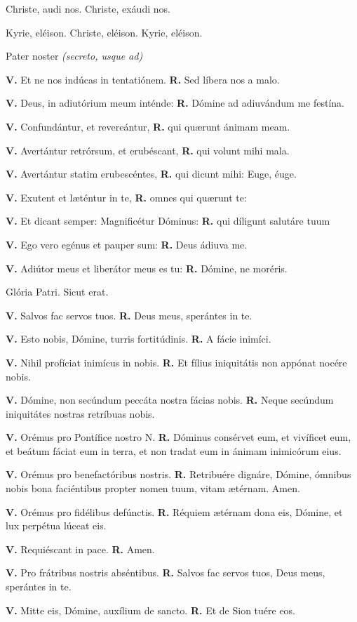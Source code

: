 \documentclass[12pt,a6paper]{book}
\newcommand{\V}{\textbf{V.} }
\newcommand{\R}{\textbf{R.} }
\begin{document}
\begin{sloppy}
\vspace{3mm}

Christe, audi nos. Christe, exáudi nos.

Kyrie, eléison. Christe, eléison. Kyrie, eléison.

Pater noster \textit{(secreto, usque ad)}

\V Et ne nos indúcas in tentatiónem. 
\R Sed líbera nos a malo.

\V Deus, in adiutórium meum inténde: 
\R Dómine ad adiuvándum me festína.

\V Confundántur, et revereántur, 
\R qui quærunt ánimam meam.

\V Avertántur retrórsum, et erubéscant, 
\R qui volunt mihi mala.

\V Avertántur statim erubescéntes, 
\R qui dicunt mihi: Euge, éuge.

\V Exutent et læténtur in te, 
\R omnes qui quærunt te:

\V Et dicant semper: Magnificétur Dóminus: 
\R qui díligunt salutáre tuum

\V Ego vero egénus et pauper sum: 
\R Deus ádiuva me.

\V Adiútor meus et liberátor meus es tu: 
\R Dómine, ne moréris.

Glória Patri. Sicut erat.

\V Salvos fac servos tuos. 
\R Deus meus, sperántes in te.

\V Esto nobis, Dómine, turris fortitúdinis. 
\R A fácie inimíci.

\V Nihil profíciat inimícus in nobis. 
\R Et fílius iniquitátis non appónat nocére nobis.

\V Dómine, non secúndum peccáta nostra fácias nobis. 
\R Neque secúndum iniquitátes nostras retríbuas nobis.

\V Orémus pro Pontífice nostro N. 
\R Dóminus consérvet eum, et vivíficet eum, et beátum fáciat eum in terra, et non tradat eum in ánimam inimicórum eius.

\V Orémus pro benefactóribus nostris. 
\R Retribuére dignáre, Dómine, ómnibus nobis bona faciéntibus propter nomen tuum, vitam ætérnam. Amen.

\V Orémus pro fidélibus defúnctis.
\R Réquiem ætérnam dona eis, Dómine, et lux perpétua lúceat eis.

\V Requiéscant in pace. 
\R Amen.

\V Pro frátribus nostris abséntibus. 
\R Salvos fac servos tuos, Deus meus, sperántes in te.

\V Mitte eis, Dómine, auxílium de sancto. 
\R Et de Sion tuére eos.


\end{sloppy}
\end{document}
